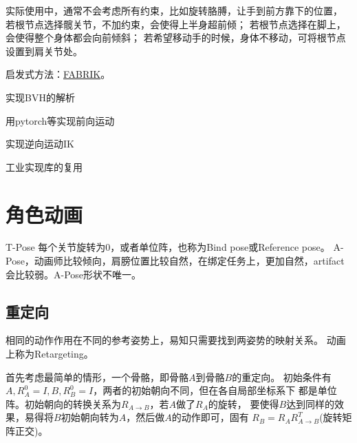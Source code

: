 \documentclass[lang=cn,newtx,10pt,scheme=chinese]{elegantbook}
\begin{document}
实际使用中，通常不会考虑所有约束，比如旋转胳膊，让手到前方靠下的位置，
若根节点选择髋关节，不加约束，会使得上半身超前倾；
若根节点选择在脚上，会使得整个身体都会向前倾斜；
若希望移动手的时候，身体不移动，可将根节点设置到肩关节处。

启发式方法：\href{http://andreasaristidou.com/FABRIK.html}{FABRIK}。


\begin{problemset}
  \item 实现BVH的解析
  \item 用pytorch等实现前向运动
  \item 实现逆向运动IK
  \item 工业实现库的复用
\end{problemset}

\chapter{角色动画}
T-Pose 每个关节旋转为0，或者单位阵，也称为Bind pose或Reference pose。
A-Pose，动画师比较倾向，肩膀位置比较自然，在绑定任务上，更加自然，artifact
会比较弱。A-Pose形状不唯一。

\section{重定向}
相同的动作作用在不同的参考姿势上，易知只需要找到两姿势的映射关系。
动画上称为Retargeting。

首先考虑最简单的情形，一个骨骼，即骨骼$A$到骨骼$B$的重定向。
初始条件有$A, R^{0}_A = I, B, R^{0}_B = I$，两者的初始朝向不同，但在各自局部坐标系下
都是单位阵。初始朝向的转换关系为$R_{A \rightarrow B}$，若$A$做了$R_A$的旋转，
要使得$B$达到同样的效果，易得将$B$初始朝向转为$A$，然后做$A$的动作即可，固有
$R_B=R_A R_{A\rightarrow B}^T$(旋转矩阵正交)。
\end{document}
